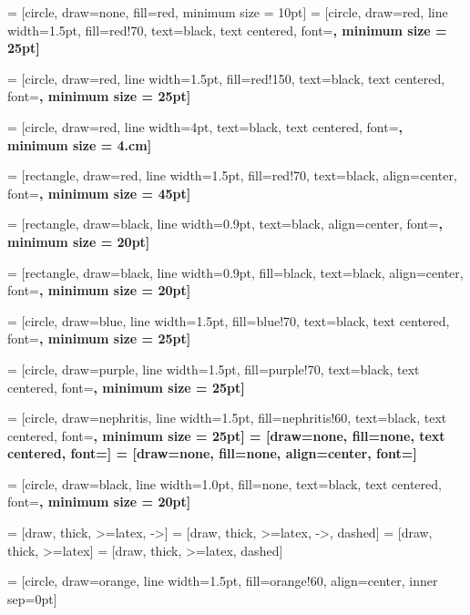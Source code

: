 
 = [circle, draw=none, fill=red, minimum size = 10pt]
 = [circle, draw=red, line width=1.5pt, fill=red!70, text=black, text centered, font=\bf \normalsize, minimum size = 25pt]

 = [circle, draw=red, line width=1.5pt, fill=red!150, text=black, text centered, font=\bf \normalsize, minimum size = 25pt]


 = [circle, draw=red, line width=4pt, text=black, text centered, font=\bf \normalsize, minimum size = 4.cm]

 = [rectangle, draw=red, line width=1.5pt, fill=red!70, text=black, align=center, font=\bf \normalsize, minimum size = 45pt]

 = [rectangle, draw=black, line width=0.9pt, text=black, align=center, font=\bf \normalsize, minimum size = 20pt]

 = [rectangle, draw=black, line width=0.9pt, fill=black, text=black, align=center, font=\bf \normalsize, minimum size = 20pt]

 = [circle, draw=blue, line width=1.5pt, fill=blue!70, text=black, text centered, font=\bf \normalsize, minimum size = 25pt]

 = [circle, draw=purple, line width=1.5pt, fill=purple!70, text=black, text centered, font=\bf \normalsize, minimum size = 25pt]


 = [circle, draw=nephritis, line width=1.5pt, fill=nephritis!60, text=black, text centered, font=\bf \normalsize, minimum size = 25pt]
 = [draw=none, fill=none, text centered, font=\bf \normalsize]
 = [draw=none, fill=none, align=center, font=\bf \normalsize]

 = [circle, draw=black, line width=1.0pt, fill=none, text=black, text centered, font=\bf \normalsize, minimum size = 20pt]


  = [draw, thick, >=latex, ->]
  = [draw, thick, >=latex, ->, dashed]
  = [draw, thick, >=latex]
  = [draw, thick, >=latex, dashed]


 = [circle, draw=orange, line width=1.5pt, fill=orange!60, align=center, inner sep=0pt]

